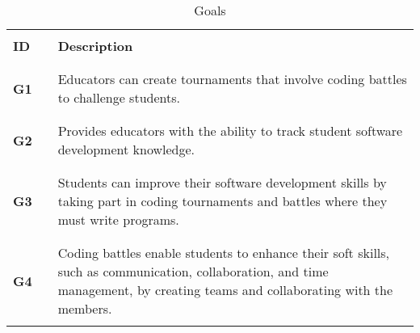 \begin{table}[H]
    \centering
    \renewcommand{\arraystretch}{0.5}
    \begin{tabular}{l l p{12.5cm}}
        \hline
                    &        &                                                                                                                                                                               \\
        \textbf{ID} & \vline & \textbf{Description}                                                                                                                                                          \\
                    &        &                                                                                                                                                                               \\\hline & & \\
        \textbf{G1} & \vline & Educators can create tournaments that involve coding battles to challenge students.                                                                                           \\
                    &        &                                                                                                                                                                               \\\hline & & \\
        \textbf{G2} & \vline & Provides educators with the ability to track student software development knowledge.                                                                                          \\
                    &        &                                                                                                                                                                               \\\hline & & \\
        \textbf{G3} & \vline & Students can improve their software development skills by taking part in coding tournaments and battles where they must write programs.                                       \\
                    &        &                                                                                                                                                                               \\\hline & & \\
        \textbf{G4} & \vline & Coding battles enable students to enhance their soft skills, such as communication, collaboration, and time management, by creating teams and collaborating with the members. \\
                    &        &                                                                                                                                                                               \\
        \hline
    \end{tabular}
    \caption{Goals}
\end{table}

